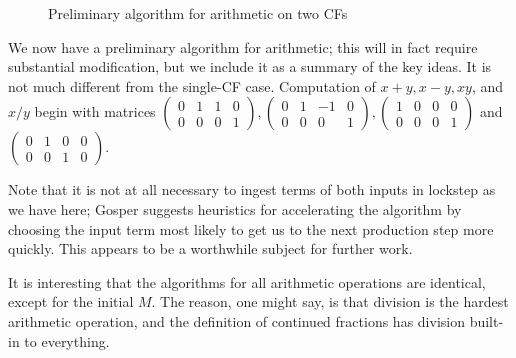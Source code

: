 \documentclass[11pt, oneside]{amsart}   	%
\newcommand{\bihomographic}[8]{\left(\begin{smallmatrix}#1&#2&#3&#4\\#5&#6&#7&#8\end{smallmatrix}\right)}
\newcommand{\abcd}{\left(
\begin{smallmatrix} 
a & b & c & d\\ 
e & f & g & h
\end{smallmatrix}
\right)}
\begin{document}
\begin{figure}\label{fig:twoCFarithPrelim}
\begin{algorithmic}
 
 
\STATE{$M \gets \abcd$} 
           \ENDWHILE
\ENDWHILE
\end{algorithmic}
\caption{Preliminary algorithm for arithmetic on two CFs}
\end{figure}

We now have a preliminary algorithm for arithmetic; this will in fact require substantial modification, but we include it as a summary
of the key ideas. It is not much different from the single-CF case. Computation of $x+y, x-y,xy$, and $x/y$ begin with matrices
$\bihomographic{0}{1}{1}{0}{0}{0}{0}{1}, \bihomographic{0}{1}{-1}{0}{0}{0}{0}{1},
\bihomographic{1}{0}{0}{0}{0}{0}{0}{1}$ and $\bihomographic{0}{1}{0}{0}{0}{0}{1}{0}$.

Note that it is not at all necessary to ingest terms of both inputs in lockstep as we have here;
Gosper suggests heuristics for accelerating the algorithm by choosing the input term most likely to get us to the next production step
more quickly. This appears to be a worthwhile subject for further work.

It is interesting that the algorithms for all arithmetic operations are identical, except for the initial $M$. The reason, one might say, is
that division is the hardest arithmetic operation, and the definition of continued fractions has division built-in to everything.
\end{document}
